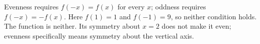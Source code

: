 Evenness requires $f(-x)=f(x)$ for every $x$; oddness requires $f(-x)=-f(x)$. Here $f(1)=1$ and $f(-1)=9$, so neither condition holds. The function is $\boxed{\text{neither}}$. Its symmetry about $x=2$ does not make it even; evenness specifically means symmetry about the vertical axis.
